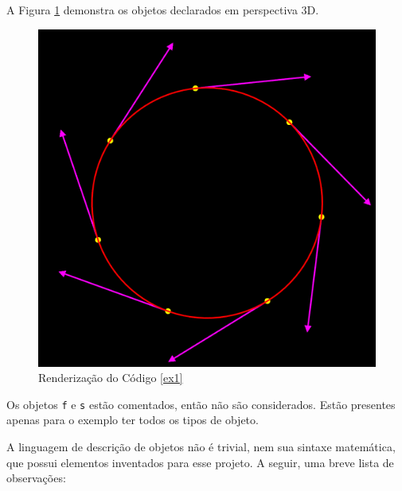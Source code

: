 A Figura \ref{img:ex1} demonstra os objetos declarados em perspectiva 3D.
\begin{figure}[!ht]
    \centering
    \includegraphics[width=0.6\linewidth, frame]{ex1.png}
    \caption{Renderização do Código \ref{ex1}}
    \label{img:ex1}
\end{figure}

Os objetos \texttt{f} e \texttt{s} estão comentados, então não são considerados.
Estão presentes apenas para o exemplo ter todos os tipos de objeto.

A linguagem de descrição de objetos não é trivial, nem sua sintaxe matemática,
que possui elementos inventados para esse projeto.
A seguir, uma breve lista de observações:

